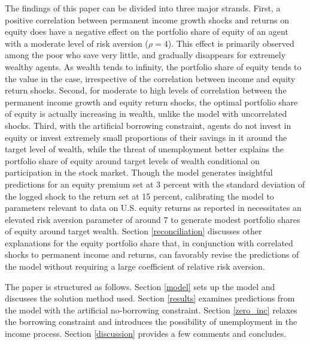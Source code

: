 The findings of this paper can be divided into three major strands. First, a positive correlation between permanent income growth shocks and returns on equity does have a negative effect on the portfolio share of equity of an agent with a moderate level of risk aversion ($\rho = 4$). This effect is primarily observed among the poor who save very little, and gradually disappears for extremely wealthy agents. As wealth tends to infinity, the portfolio share of equity tends to the value in the \citet{Merton1969,Samuelson1969} case, irrespective of the correlation between income and equity return shocks. Second, for moderate to high levels of correlation between the permanent income growth and equity return shocks, the optimal portfolio share of equity is actually increasing in wealth, unlike the model with uncorrelated shocks. Third, with the artificial borrowing constraint, agents do not invest in equity or invest extremely small proportions of their savings in it around the target level of wealth, while the threat of unemployment better explains the portfolio share of equity around target levels of wealth conditional on participation in the stock market. Though the model generates insightful predictions for an equity premium set at 3 percent with the standard deviation of the logged shock to the return set at 15 percent, calibrating the model to parameters relevant to data on U.S. equity returns as reported in \citet{Mehra2006} necessitates an elevated risk aversion parameter of around 7 to generate modest portfolio shares of equity around target wealth. Section \ref{reconciliation} discusses other explanations for the equity portfolio share that, in conjunction with correlated shocks to permanent income and returns, can favorably revise the predictions of the model without requiring a large coefficient of relative risk aversion.

The paper is structured as follows. Section \ref{model} sets up the model and discusses the solution method used. Section \ref{results} examines predictions from the model with the artificial no-borrowing constraint. Section \ref{zero_inc} relaxes the borrowing constraint and introduces the possibility of unemployment in the income process. Section \ref{discussion} provides a few comments and concludes.